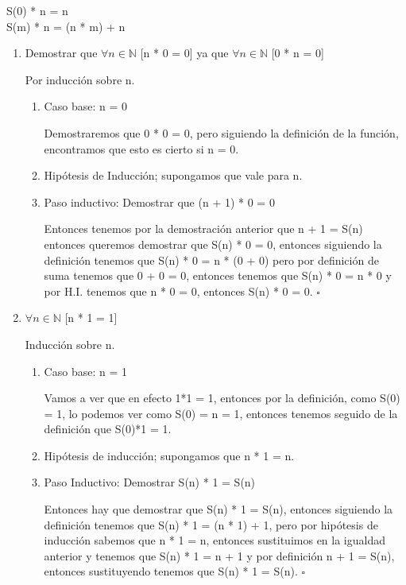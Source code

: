 \documentclass[11pt,letterpaper]{article}
\newcommand*{\QEDB}{\hfill\ensuremath{\square}}%
\newcommand\tab[1][1cm]{\hspace*{#1}}
\begin{document}
\tab[0.4cm]S(0) * n = n\\
\tab S(m) * n = (n * m) + n\\

\begin{enumerate}
\item Demostrar que $\forall n\in\mathbb{N}$ [n * 0 = 0] ya que $\forall n\in\mathbb{N}$ [0 * n = 0]

Por inducción sobre n.

\begin{enumerate}
\item Caso base: n = 0

Demostraremos que 0 * 0 = 0, pero siguiendo la definición de la función, encontramos que esto es cierto si n = 0.

\item Hipótesis de Inducción; supongamos que vale para n.
\item Paso inductivo: Demostrar que (n + 1) * 0 = 0

Entonces tenemos por la demostración anterior que n + 1 = S(n) entonces queremos demostrar que S(n) * 0 = 0, entonces siguiendo la definición tenemos que S(n) * 0 = n * (0 + 0) pero por definición de suma tenemos que 0 + 0 = 0, entonces tenemos que S(n) * 0 = n * 0 y por H.I. tenemos que n * 0 = 0, entonces S(n) * 0 = 0.
\QEDB
\end{enumerate}
\item $\forall n\in\mathbb{N}$ [n * 1 = 1]

Inducción sobre n.

\begin{enumerate}
\item Caso base: n = 1

Vamos a ver que en efecto 1*1 = 1, entonces por la definición, como S(0) = 1, lo podemos ver como S(0) = n = 1, entonces tenemos seguido de la definición que S(0)*1 = 1.

\item Hipótesis de inducción; supongamos que n * 1 = n.

\item Paso Inductivo: Demostrar S(n) * 1 = S(n)

Entonces hay que demostrar que S(n) * 1 = S(n), entonces siguiendo la definición tenemos que S(n) * 1 = (n * 1) + 1, pero por hipótesis de inducción sabemos que n * 1 = n, entonces sustituimos en la igualdad anterior y tenemos que S(n) * 1 = n + 1 y por definición n + 1 = S(n), entonces sustituyendo tenemos que S(n) * 1 = S(n).
\QEDB
\end{enumerate}
\end {enumerate}
\end{document}
